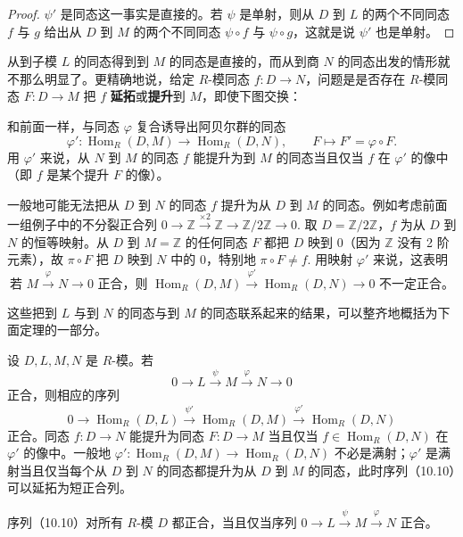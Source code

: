 \begin{proof}
\(\psi'\) 是同态这一事实是直接的。若 \(\psi\) 是单射，则从 \(D\) 到 \(L\) 的两个不同同态 \(f\) 与 \(g\) 给出从 \(D\) 到 \(M\) 的两个不同同态 \(\psi \circ f\) 与 \(\psi \circ g\)，这就是说 \(\psi'\) 也是单射。
\end{proof}

从到子模 \(L\) 的同态得到到 \(M\) 的同态是直接的，而从到商 \(N\) 的同态出发的情形就不那么明显了。更精确地说，给定 \(R\)-模同态 \(f : D \to N\)，问题是是否存在 \(R\)-模同态 \(F : D \to M\) 把 \(f\) \textbf{延拓}或\textbf{提升}到 \(M\)，即使下图交换：
\begin{center}\end{center}
和前面一样，与同态 \(\varphi\) 复合诱导出阿贝尔群的同态
\[
\varphi' : \operatorname{Hom}_R(D, M) \to \operatorname{Hom}_R(D, N), \qquad F \mapsto F' = \varphi \circ F.
\]
用 \(\varphi'\) 来说，从 \(N\) 到 \(M\) 的同态 \(f\) 能提升为到 \(M\) 的同态当且仅当 \(f\) 在 \(\varphi'\) 的像中（即 \(f\) 是某个提升 \(F\) 的像）。

一般地可能无法把从 \(D\) 到 \(N\) 的同态 \(f\) 提升为从 \(D\) 到 \(M\) 的同态。例如考虑前面一组例子中的不分裂正合列 \(0 \to \mathbb{Z} \xrightarrow{\times 2} \mathbb{Z} \to \mathbb{Z}/2\mathbb{Z} \to 0\). 取 \(D = \mathbb{Z}/2\mathbb{Z}\)，\(f\) 为从 \(D\) 到 \(N\) 的恒等映射。从 \(D\) 到 \(M = \mathbb{Z}\) 的任何同态 \(F\) 都把 \(D\) 映到 0（因为 \(\mathbb{Z}\) 没有 2 阶元素），故 \(\pi \circ F\) 把 \(D\) 映到 \(N\) 中的 0，特别地 \(\pi \circ F \neq f\). 用映射 \(\varphi'\) 来说，这表明
\[
\text{若 } M \xrightarrow{\varphi} N \to 0 \text{ 正合，则 } \operatorname{Hom}_R(D, M) \xrightarrow{\varphi'} \operatorname{Hom}_R(D, N) \to 0 \text{ 不一定正合}。
\]

这些把到 \(L\) 与到 \(N\) 的同态与到 \(M\) 的同态联系起来的结果，可以整齐地概括为下面定理的一部分。

\begin{theorem}\label{thm:10.28}
设 \(D, L, M, N\) 是 \(R\)-模。若
\[
0 \longrightarrow L \xrightarrow{\ \psi\ } M \xrightarrow{\ \varphi\ } N \longrightarrow 0
\]
正合，则相应的序列
\begin{equation}
0 \longrightarrow \operatorname{Hom}_R(D, L) \xrightarrow{\ \psi'\ } \operatorname{Hom}_R(D, M) \xrightarrow{\ \varphi'\ } \operatorname{Hom}_R(D, N) \tag{10.10}
\end{equation}
正合。同态 \(f : D \to N\) 能提升为同态 \(F : D \to M\) 当且仅当 \(f \in \operatorname{Hom}_R(D, N)\) 在 \(\varphi'\) 的像中。一般地 \(\varphi' : \operatorname{Hom}_R(D, M) \to \operatorname{Hom}_R(D, N)\) 不必是满射；\(\varphi'\) 是满射当且仅当每个从 \(D\) 到 \(N\) 的同态都提升为从 \(D\) 到 \(M\) 的同态，此时序列（10.10）可以延拓为短正合列。

序列（10.10）对所有 \(R\)-模 \(D\) 都正合，当且仅当序列 \(0 \to L \xrightarrow{\psi} M \xrightarrow{\varphi} N\) 正合。
\end{theorem}

